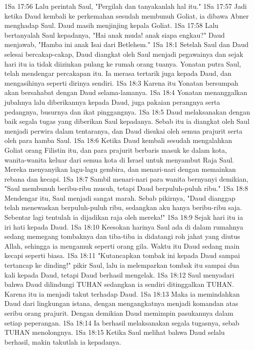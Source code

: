 1Sa 17:56  Lalu perintah Saul, "Pergilah dan tanyakanlah hal itu."
1Sa 17:57  Jadi ketika Daud kembali ke perkemahan sesudah membunuh Goliat, ia dibawa Abner menghadap Saul. Daud masih menjinjing kepala Goliat.
1Sa 17:58  Lalu bertanyalah Saul kepadanya, "Hai anak muda! anak siapa engkau?" Daud menjawab, "Hamba ini anak Isai dari Betlehem."
1Sa 18:1  Setelah Saul dan Daud selesai bercakap-cakap, Daud diangkat oleh Saul menjadi pegawainya dan sejak hari itu ia tidak diizinkan pulang ke rumah orang tuanya. Yonatan putra Saul, telah mendengar percakapan itu. Ia merasa tertarik juga kepada Daud, dan mengasihinya seperti dirinya sendiri.
1Sa 18:3  Karena itu Yonatan bersumpah akan bersahabat dengan Daud selama-lamanya.
1Sa 18:4  Yonatan menanggalkan jubahnya lalu diberikannya kepada Daud, juga pakaian perangnya serta pedangnya, busurnya dan ikat pinggangnya.
1Sa 18:5  Daud melaksanakan dengan baik segala tugas yang diberikan Saul kepadanya. Sebab itu ia diangkat oleh Saul menjadi perwira dalam tentaranya, dan Daud disukai oleh semua prajurit serta oleh para hamba Saul.
1Sa 18:6  Ketika Daud kembali sesudah mengalahkan Goliat orang Filistin itu, dan para prajurit berbaris masuk ke dalam kota, wanita-wanita keluar dari semua kota di Israel untuk menyambut Raja Saul. Mereka menyanyikan lagu-lagu gembira, dan menari-nari dengan memainkan rebana dan kecapi.
1Sa 18:7  Sambil menari-nari para wanita bernyanyi demikian, "Saul membunuh beribu-ribu musuh, tetapi Daud berpuluh-puluh ribu."
1Sa 18:8  Mendengar itu, Saul menjadi sangat marah. Sebab pikirnya, "Daud dianggap telah menewaskan berpuluh-puluh ribu, sedangkan aku hanya beribu-ribu saja. Sebentar lagi tentulah ia dijadikan raja oleh mereka!"
1Sa 18:9  Sejak hari itu ia iri hati kepada Daud.
1Sa 18:10  Keesokan harinya Saul ada di dalam rumahnya sedang memegang tombaknya dan tiba-tiba ia didatangi roh jahat yang diutus Allah, sehingga ia mengamuk seperti orang gila. Waktu itu Daud sedang main kecapi seperti biasa.
1Sa 18:11  "Kutancapkan tombak ini kepada Daud sampai tertancap ke dinding!" pikir Saul, lalu ia melemparkan tombak itu sampai dua kali kepada Daud, tetapi Daud berhasil mengelak.
1Sa 18:12  Saul menyadari bahwa Daud dilindungi TUHAN sedangkan ia sendiri ditinggalkan TUHAN. Karena itu ia menjadi takut terhadap Daud.
1Sa 18:13  Maka ia memindahkan Daud dari lingkungan istana, dengan mengangkatnya menjadi komandan atas seribu orang prajurit. Dengan demikian Daud memimpin pasukannya dalam setiap peperangan.
1Sa 18:14  Ia berhasil melaksanakan segala tugasnya, sebab TUHAN menolongnya.
1Sa 18:15  Ketika Saul melihat bahwa Daud selalu berhasil, makin takutlah ia kepadanya.
